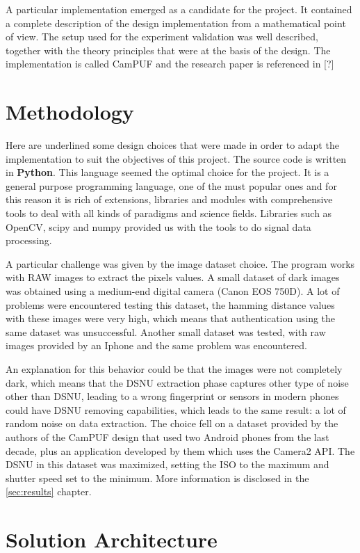 A particular implementation emerged as a candidate for the project. It contained a complete description of the design implementation from a mathematical point of view.
The setup used for the experiment validation was well described, together with the theory principles that were at the basis of the design.
The implementation is called CamPUF and the research paper is referenced in [?]


\section{Methodology}
Here are underlined some design choices that were made in order to adapt the implementation to suit the objectives of this project.
The source code is written in \textbf{Python}. This language seemed the optimal choice for the project. It is a general purpose programming language, one of the must popular ones
and for this reason it is rich of extensions, libraries and modules with comprehensive tools to deal with all kinds of paradigms and science fields.
Libraries such as OpenCV, scipy and numpy provided us with the tools to do signal data processing.

A particular challenge was given by the image dataset choice. The program works with RAW images to extract the pixels values. A small dataset of dark images was obtained using a medium-end digital camera (Canon EOS 750D).
A lot of problems were encountered testing this dataset, the hamming distance values with these images were very high, which means that authentication using the same dataset was unsuccessful.
Another small dataset was tested, with raw images provided by an Iphone and the same problem was encountered. 

An explanation for this behavior could be that the images were not completely dark, which means that the DSNU extraction phase captures other type of noise other than DSNU,
leading to a wrong fingerprint or sensors in modern phones could have DSNU removing capabilities, which leads to the same result: a lot of random noise on data extraction.
The choice fell on a dataset provided by the authors of the CamPUF design that used two Android phones from the last decade, plus an application developed by them which uses the Camera2 API.
The DSNU in this dataset was maximized, setting the ISO to the maximum and shutter speed set to the minimum. More information is disclosed in the \ref{sec:results} chapter.

\section{Solution Architecture}
